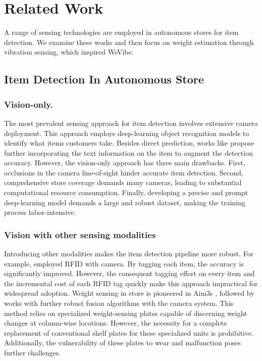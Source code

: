 \section{Related Work}
\label{sec:Related Work} 
A range of sensing technologies are employed in autonomous stores for item detection. We examine these works and then focus on weight estimation through vibration sensing, which inspired WeVibe.


\subsection{Item Detection In Autonomous Store}
\subsubsection{Vision-only.} The most prevalent sensing approach for item detection involves extensive camera deployment. This approach employs deep-learning object recognition models \cite{he2017mask,wang2023yolov7,tan2020efficientdet} to identify what items customers take. Besides direct prediction, works like \cite{9200182,torres2018text} propose further incorporating the text information on the item to augment the detection accuracy. However, the vision-only approach has three main drawbacks. First, occlusions in the camera line-of-sight hinder accurate item detection. Second, comprehensive store coverage demands many cameras, leading to substantial computational resource consumption. Finally, developing a precise and prompt deep-learning model demands a large and robust dataset, making the training process labor-intensive.


\subsubsection{Vision with other sensing modalities} Introducing other modalities makes the item detection pipeline more robust. For example, \cite{roussos2006enabling,zhang2016mobile} employed RFID with camera. By tagging each item, the accuracy is significantly improved. However, the consequent tagging effort on every item and the incremental cost of each RFID tag quickly make this approach impractical for widespread adoption. Weight sensing in store is pioneered in Aim3s \cite{ruiz2019aim3s}, followed by works with further robust fusion algorithms with the camera system\cite{falcao2021isacs,falcao2020faim}. This method relies on specialized weight-sensing plates capable of discerning weight changes at column-wise locations. However, the necessity for a complete replacement of conventional shelf plates for these specialized units is prohibitive. Additionally, the vulnerability of these plates to wear and malfunction poses further challenges.


